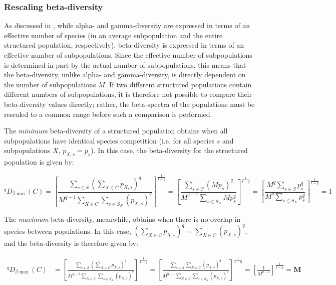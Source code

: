 \subsubsection{Rescaling beta-diversity}
\label{sec:diversity-structured-rescaling}


As discussed in , while alpha- and gamma-diversity are expressed in terms of an effective number of species (in an average subpopulation and the entire structured population, respectively), beta-diversity is expressed in terms of an effective number of subpopulations. Since the effective number of subpopulations is determined in part by the actual number of subpopulations, this means that the beta-diversity, unlike alpha- and gamma-diversity, is directly dependent on the number of subpopulations $M$. If two different structured populations contain different numbers of subpopulations, it is therefore not possible to compare their beta-diversity values directly; rather, the beta-spectra of the populations must be rescaled to a common range before such a comparison is performed.

The \textit{minimum} beta-diversity of a structured population obtains when all subpopulations have identical species competition (i.e. for all species $s$ and subpopulations $X$, $p_{X,s} = p_{s}$). In this case, the beta-diversity for the structured population is given by: %

\begin{equation}
^qD_{\beta\min}(C) = \left[
\frac{\displaystyle\sum_{s \in S}\left(\sum_{X \in C} p_{X,s}\right)^q}{\displaystyle M^{q-1} \sum_{X \in C}\sum_{s \in S_X} (p_{X,s})^q}
\right]^\frac{1}{1-q}
= \left[
\frac{\displaystyle\sum_{s \in S}\left(Mp_s\right)^q}{\displaystyle M^{q-1}\sum_{s \in S_X} Mp_s^q}
\right]^\frac{1}{1-q}
= \left[
\frac{M^q\displaystyle\sum_{s \in S}p_s^q}{M^q\displaystyle\sum_{s \in S_X} p_s^q}
\right]^\frac{1}{1-q} = 1
\label{eq:diversity_beta_min}
\end{equation}

\noindent The \textit{maximum} beta-diversity, meanwhile, obtains when there is no overlap in species between populations. In this case, $\left(\sum_{X \in C} p_{X,s}\right)^q = \sum_{X \in C} (p_{X,s})^q$, and the beta-diversity is therefore given by:

\begin{equation}\begin{split}
^qD_{\beta\max}(C) &
= \left[\frac{\displaystyle\sum_{s \in S}\left(\sum_{X \in C} p_{X,s}\right)^q}{\displaystyle M^{q-1} \sum_{X \in C}\sum_{s \in S_X} (p_{X,s})^q}\right]^\frac{1}{1-q}
= \left[\frac{\displaystyle\sum_{s \in S}\sum_{X \in C} (p_{X,s})^q}{\displaystyle M^{q-1} \sum_{X \in C}\sum_{s \in S_X} (p_{X,s})^q}\right]^\frac{1}{1-q}
= \left[\frac{1}{M^{q-1}}\right]^\frac{1}{1-q} = \boldsymbol{M}
\end{split}
\label{eq:diversity_beta_max}
\end{equation}

